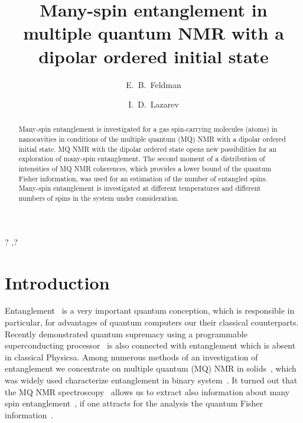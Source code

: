 \documentclass[review]{elsarticle}
\begin{document}
\begin{frontmatter}

\title{Many-spin entanglement in multiple quantum NMR with a dipolar ordered initial state}

\author[icp]{E.~B.~Feldman}
\author[icp,msu]{I.~D.~Lazarev} %

\address[icp]{Institute of Problems of Chemical Physics of Russian Academy of Sciences, \\ Chernogolovka, Moscow Region, Russia 142432}
\address[msu]{Faculty of Fundamental Physical-Chemical Engineering, Lomonosov Moscow State University, GSP-1, Moscow, Russia 119991}



\begin{abstract}
Many-spin entanglement is investigated for a gas spin-carrying molecules (atoms) in nanocavities 
in conditions of the multiple quantum (MQ) NMR with a dipolar ordered initial state.
MQ NMR with the dipolar ordered state opens new possibilities for an exploration of many-spin entanglement. 
The second moment of a distribution of intensities of MQ NMR coherences,
which provides a lower bound of the quantum Fisher information, 
was used for an estimation of the number of entangled spins. 
Many-spin entanglement is investigated at different temperatures and different numbers of spins in the system under consideration.
\end{abstract}

\begin{keyword}
? \sep ?
\end{keyword}

\end{frontmatter}

\linenumbers

\section{Introduction}
\label{sec:1}

Entanglement~\cite{Nielsen_2009} is a very important quantum conception, which is responsible in particular, for advantages of quantum computers our their classical counterparts.
Recently demonstrated quantum supremacy using a programmable superconducting processor~\cite{Arute2019} is also connected with entanglement which is absent in classical Physicsa.
Among numerous methods of an investigation of entanglement we concentrate on multiple quantum (MQ) NMR in solids~\cite{Baum_1985}, which was widely used characterize entanglement in binary system~\cite{Furman_2008,Furman_2009,Fel_dman_2008,Fel_dman_2012}. 
It turned out that the MQ NMR spectroscopy~\cite{Nielsen_2009} allows us to extract also information about many spin entanglement~\cite{?}, 
if one attracts for the analysis the quantum Fisher information~\cite{T_th_2014,Pezz__2018}.
\end{document}
